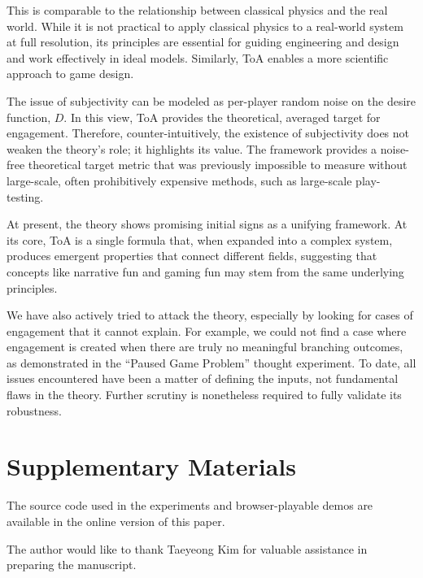 \documentclass[manuscript,review,anonymous]{acmart}
\theoremstyle{definition}
\theoremstyle{plain}
\begin{document}
This is comparable to the relationship between classical physics and the real world.
While it is not practical to apply classical physics to a real-world system at full resolution, its principles are essential for guiding engineering and design and work effectively in ideal models.
Similarly, ToA enables a more scientific approach to game design.

The issue of subjectivity can be modeled as per-player random noise on the desire function, $D$.
In this view, ToA provides the theoretical, averaged target for engagement.
Therefore, counter-intuitively, the existence of subjectivity does not weaken the theory's role; it highlights its value.
The framework provides a noise-free theoretical target metric that was previously impossible to measure without large-scale, often prohibitively expensive methods, such as large-scale play-testing.

At present, the theory shows promising initial signs as a unifying framework.
At its core, ToA is a single formula that, when expanded into a complex system, produces emergent properties that connect different fields, suggesting that concepts like narrative fun and gaming fun may stem from the same underlying principles.

We have also actively tried to attack the theory, especially by looking for cases of engagement that it cannot explain.
For example, we could not find a case where engagement is created when there are truly no meaningful branching outcomes, as demonstrated in the ``Paused Game Problem'' thought experiment.
To date, all issues encountered have been a matter of defining the inputs, not fundamental flaws in the theory.
Further scrutiny is nonetheless required to fully validate its robustness.

\section{Supplementary Materials}
The source code used in the experiments and browser-playable demos are available in the online version of this paper.

\begin{acks}
  The author would like to thank Taeyeong Kim for valuable assistance in preparing the manuscript.
\end{acks}



\end{document}
